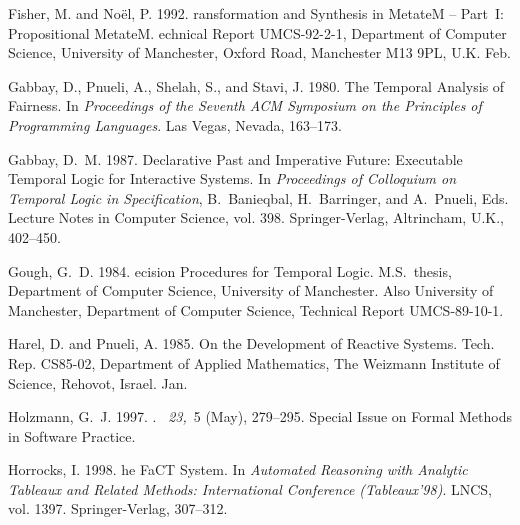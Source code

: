 \documentclass[nohyperref]{acmtrans2f}
\begin{document}
\begin{thebibliography}{}
{\sc Fisher, M.} {\sc and} {\sc No{\"e}l, P.} 1992.
ransformation and {S}ynthesis in \hbox{{\sc MetateM}} --
  {P}art~{I}: {P}ropositional \hbox{{\sc MetateM}}.
echnical {R}eport {UMCS-92-2-1}, Department of Computer Science,
  University of Manchester, Oxford Road, Manchester M13 9PL, U.K. Feb.

{\sc Gabbay, D.}, {\sc Pnueli, A.}, {\sc Shelah, S.}, {\sc and} {\sc Stavi, J.}
  1980.
\newblock The {T}emporal {A}nalysis of {F}airness.
\newblock In {\em Proceedings of the Seventh {ACM} Symposium on the Principles
  of Programming Languages}. Las Vegas, Nevada, 163--173.

{\sc Gabbay, D.~M.} 1987.
\newblock Declarative {P}ast and {I}mperative {F}uture: {E}xecutable {T}emporal
  {L}ogic for {I}nteractive {S}ystems.
\newblock In {\em Proceedings of {C}olloquium on {T}emporal {L}ogic in
  {S}pecification}, {B.~Banieqbal}, {H.~Barringer}, {and} {A.~Pnueli}, Eds.
  Lecture Notes in Computer Science, vol. 398. Springer-Verlag, {A}ltrincham,
  U.K., 402--450.

{\sc Gough, G.~D.} 1984.
ecision {P}rocedures for {T}emporal {L}ogic.
\newblock M.S.\ thesis, Department of Computer Science, University of
  Manchester.
\newblock Also University of Manchester, Department of Computer Science,
  Technical Report UMCS-89-10-1.

{\sc Harel, D.} {\sc and} {\sc Pnueli, A.} 1985.
\newblock On the {D}evelopment of {R}eactive {S}ystems.
\newblock Tech. Rep. CS85-02, Department of Applied Mathematics, The Weizmann
  Institute of Science, Rehovot, Israel. Jan.

{\sc Holzmann, G.~J.} 1997.
.
~{\em 23,\/}~5 (May),
  279--295.
\newblock Special Issue on Formal Methods in Software Practice.

{\sc Horrocks, I.} 1998.
he {FaCT} {S}ystem.
\newblock In {\em Automated Reasoning with Analytic Tableaux and Related
  Methods: International Conference (Tableaux'98)}. LNCS, vol. 1397.
  Springer-Verlag, 307--312.


\end{thebibliography}
\end{document}

